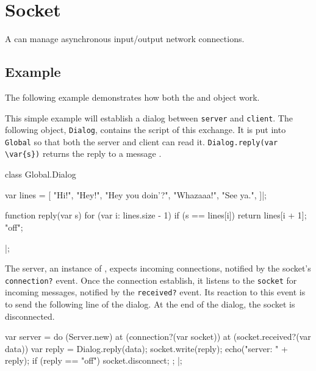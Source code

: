 
\section{Socket}

A  can manage asynchronous input/output network
connections.

\subsection{Example}

The following example demonstrates how both the  and
 object work.

This simple example will establish a dialog between
\lstinline|server| and \lstinline|client|.  The following object,
\lstinline|Dialog|, contains the script of this exchange.  It is put
into \lstinline|Global| so that both the server and client can read
it.  \lstinline|Dialog.reply(var \var{s})| returns the reply to a
message .

\begin{urbiscript}
class Global.Dialog
{
  var lines =
  [
    "Hi!",
    "Hey!",
    "Hey you doin'?",
    "Whazaaa!",
    "See ya.",
  ]|;

  function reply(var s)
  {
    for (var i: lines.size - 1)
      if (s == lines[i])
        return lines[i + 1];
    "off";
  }
}|;
\end{urbiscript}

The server, an instance of , expects incoming
connections, notified by the socket's \lstinline|connection?| event.
Once the connection establish, it listens to the \lstinline|socket|
for incoming messages, notified by the \lstinline|received?| event.
Its reaction to this event is to send the following line of the
dialog.  At the end of the dialog, the socket is disconnected.

\begin{urbiscript}
var server =
  do (Server.new)
  {
    at (connection?(var socket))
      at (socket.received?(var data))
      {
        var reply = Dialog.reply(data);
        socket.write(reply);
        echo("server: " + reply);
        if (reply == "off")
          socket.disconnect;
      };
  }|;
\end{urbiscript}

